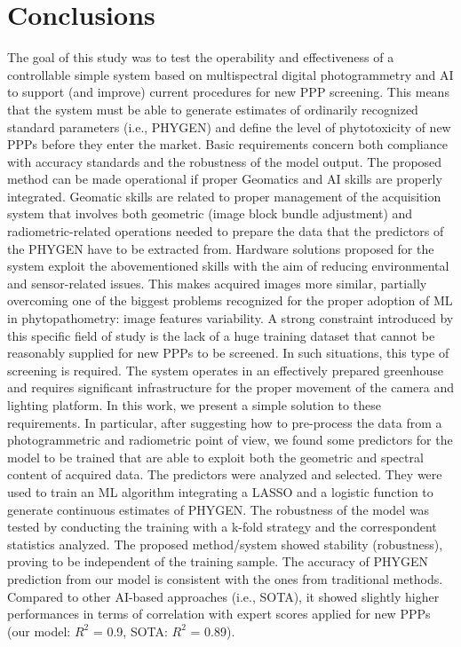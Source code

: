 \documentclass[12pt,a4paper,oneside]{report}
\begin{document}
\section{Conclusions}

The goal of this study was to test the operability and effectiveness of a controllable simple system based on multispectral digital photogrammetry and AI to support (and improve) current procedures for new PPP screening. This means that the system must be able to generate estimates of ordinarily recognized standard parameters (i.e., PHYGEN) and define the level of phytotoxicity of new PPPs before they enter the market. Basic requirements concern both compliance with accuracy standards and the robustness of the model output.
The proposed method can be made operational if proper Geomatics and AI skills are properly integrated. Geomatic skills are related to proper management of the acquisition system that involves both geometric (image block bundle adjustment) and radiometric-related operations needed to prepare the data that the predictors of the PHYGEN have to be extracted from. Hardware solutions proposed for the system exploit the abovementioned skills with the aim of reducing environmental and sensor-related issues. This makes acquired images more similar, partially overcoming one of the biggest problems recognized for the proper adoption of ML in phytopathometry: image features variability.
A strong constraint introduced by this specific field of study is the lack of a huge training dataset that cannot be reasonably supplied for new PPPs to be screened. In such situations, this type of screening is required.
The system operates in an effectively prepared greenhouse and requires significant infrastructure for the proper movement of the camera and lighting platform.
In this work, we present a simple solution to these requirements. In particular, after suggesting how to pre-process the data from a photogrammetric and radiometric point of view, we found some predictors for the model to be trained that are able to exploit both the geometric and spectral content of acquired data.
The predictors were analyzed and selected. They were used to train an ML algorithm integrating a LASSO and a logistic function to generate continuous estimates of PHYGEN. The robustness of the model was tested by conducting the training with a k-fold strategy and the correspondent statistics analyzed.
The proposed method/system showed stability (robustness), proving to be independent of the training sample. The accuracy of PHYGEN prediction from our model is consistent with the ones from traditional methods. Compared to other AI-based approaches (i.e., SOTA), it showed slightly higher performances in terms of correlation with expert scores applied for new PPPs (our model: $R^2$ = 0.9, SOTA: $R^2$ = 0.89).
\end{document}
